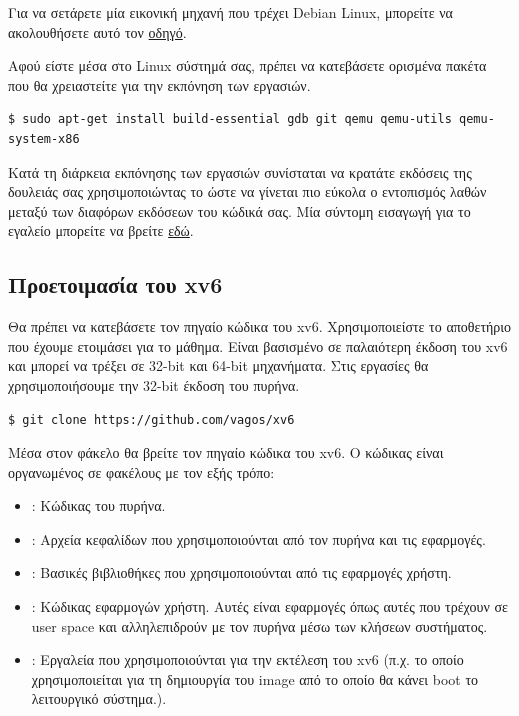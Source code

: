 \documentclass[18pt]{extarticle}
\begin{document}
Για να σετάρετε μία εικονική μηχανή που τρέχει Debian Linux, μπορείτε να ακολουθήσετε αυτό τον \href{}{οδηγό}. %

Αφού είστε μέσα στο Linux σύστημά σας, πρέπει να κατεβάσετε ορισμένα πακέτα που θα χρειαστείτε για την εκπόνηση των εργασιών.

\begin{commandline}
\begin{verbatim}
$ sudo apt-get install build-essential gdb git qemu qemu-utils qemu-system-x86
\end{verbatim}
\end{commandline}

Κατά τη διάρκεια εκπόνησης των εργασιών συνίσταται να κρατάτε εκδόσεις της δουλειάς σας χρησιμοποιώντας το 
ώστε να γίνεται πιο εύκολα ο εντοπισμός λαθών μεταξύ των διαφόρων εκδόσεων του κώδικά σας.
Μία σύντομη εισαγωγή για το εγαλείο μπορείτε να βρείτε \href{https://rogerdudler.github.io/git-guide/}{εδώ}. 

\subsection{Προετοιμασία του xv6}

Θα πρέπει να κατεβάσετε τον πηγαίο κώδικα του xv6. Χρησιμοποιείστε το αποθετήριο που έχουμε ετοιμάσει για το μάθημα. 
Είναι βασισμένο σε παλαιότερη έκδοση του xv6 και μπορεί να τρέξει σε 32-bit και 64-bit μηχανήματα.
Στις εργασίες θα χρησιμοποιήσουμε την 32-bit έκδοση του πυρήνα.

\begin{commandline}
\begin{verbatim}
$ git clone https://github.com/vagos/xv6
\end{verbatim}
\end{commandline}

Μέσα στον φάκελο  θα βρείτε τον πηγαίο κώδικα του xv6.
Ο κώδικας είναι οργανωμένος σε φακέλους με τον εξής τρόπο: 

\begin{itemize}[label={--}]
    \item {}: Κώδικας του πυρήνα.
    \item {}: Αρχεία κεφαλίδων που χρησιμοποιούνται από τον πυρήνα και τις εφαρμογές.
    \item {}: Βασικές βιβλιοθήκες που χρησιμοποιούνται από τις εφαρμογές χρήστη.
    \item {}: Κώδικας εφαρμογών χρήστη. Αυτές είναι εφαρμογές όπως αυτές που τρέχουν σε user space και αλληλεπιδρούν με τον πυρήνα μέσω των κλήσεων συστήματος.
    \item {}: Εργαλεία που χρησιμοποιούνται για την εκτέλεση του xv6 (π.χ.  το οποίο χρησιμοποιείται για τη δημιουργία του image από το οποίο θα κάνει boot το λειτουργικό σύστημα.).
\end{itemize}
\end{document}
